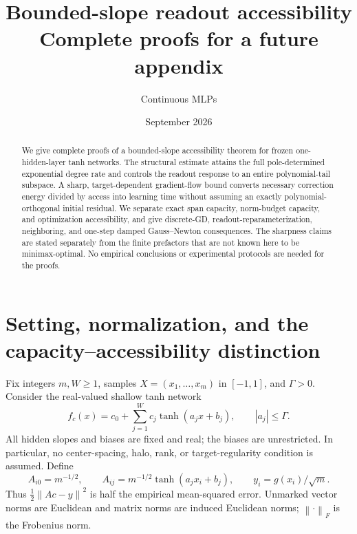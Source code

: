 \documentclass[11pt,letterpaper]{article}
\title{\vspace{-1.5em}\color{bsaInk}\textbf{Bounded-slope readout accessibility}\\[4pt]
 \large Complete proofs for a future appendix}
\author{Continuous MLPs}
\date{September 2026}
\newcommand{\bsaNorm}[1]{\left\lVert #1\right\rVert}
\theoremstyle{remark}
\theoremstyle{plain}
\begin{document}
\maketitle
\thispagestyle{fancy}
\vspace{-1.3em}
\begin{abstract}
We give complete proofs of a bounded-slope accessibility theorem for frozen one-hidden-layer tanh networks. The structural estimate attains the full pole-determined exponential degree rate and controls the readout response to an entire polynomial-tail subspace. A sharp, target-dependent gradient-flow bound converts necessary correction energy divided by access into learning time without assuming an exactly polynomial-orthogonal initial residual. We separate exact span capacity, norm-budget capacity, and optimization accessibility, and give discrete-GD, readout-reparameterization, neighboring, and one-step damped Gauss--Newton consequences. The sharpness claims are stated separately from the finite prefactors that are not known here to be minimax-optimal. No empirical conclusions or experimental protocols are needed for the proofs.
\end{abstract}
\section{Setting, normalization, and the capacity--accessibility distinction}
\label{bsa:sec:setup}

Fix integers $m,W\ge1$, samples $X=(x_1,\ldots,x_m)$ in $[-1,1]$, and $\Gamma>0$. Consider the real-valued shallow tanh network
\begin{equation}
 f_c(x)=c_0+\sum_{j=1}^W c_j\tanh(a_jx+b_j),
 \qquad |a_j|\le\Gamma.
 \label{bsa:eq:network}
\end{equation}
All hidden slopes and biases are fixed and real; the biases are unrestricted. In particular, no center-spacing, halo, rank, or target-regularity condition is assumed. Define
\begin{equation}
 A_{i0}=m^{-1/2},\qquad
 A_{ij}=m^{-1/2}\tanh(a_jx_i+b_j),\qquad
 y_i=g(x_i)/\sqrt m.
 \label{bsa:eq:matrix}
\end{equation}
Thus $\tfrac12\bsaNorm{Ac-y}^2$ is half the empirical mean-squared error. Unmarked vector norms are Euclidean and matrix norms are induced Euclidean norms; $\bsaNorm{\cdot}_F$ is the Frobenius norm.
\end{document}
